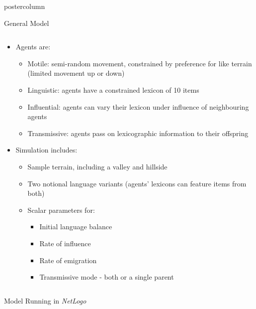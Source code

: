\documentclass[final,hyperref={pdfpagelabels=false}]{beamer}
\begin{document}
\begin{frame}
\begin{columns}
\begin{column}{.33\textwidth}
\begin{beamercolorbox}[center,wd=\textwidth]{postercolumn}
\begin{minipage}[T]{.95\textwidth}
{\begin{block}{General Model}
              \begin{columns}
                \begin{column}{.99\textwidth}
                  \begin{itemize}
                    \item Agents are:
                      \begin{itemize}
                        \item Motile: semi-random movement, constrained by preference for like terrain (limited movement up or down)
                        \item Linguistic: agents have a constrained lexicon of 10 items
                        \item Influential: agents can vary their lexicon under influence of neighbouring agents
                        \item Transmissive: agents pass on lexicographic information to their offspring
                      \end{itemize}
                    \item Simulation includes:
                      \begin{itemize}
                        \item Sample terrain, including a valley and hillside
                        \item Two notional language variants (agents' lexicons can feature items from both)
                        \item Scalar parameters for:
                          \begin{itemize}
                            \item Initial language balance
                            \item Rate of influence
                            \item Rate of emigration
                            \item Transmissive mode - both or a single parent
                          \end{itemize}
                      \end{itemize}
                  \end{itemize}
                \end{column}
              \end{columns}
            \end{block}
            \vfill
            \begin{block}{Model Running in \textit{NetLogo}}

\end{block}}
\end{minipage}
\end{beamercolorbox}
\end{column}
\end{columns}
\end{frame}
\end{document}
